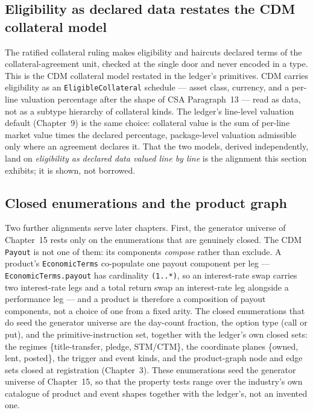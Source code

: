 \subsection{Eligibility as declared data restates the CDM collateral model}

The ratified collateral ruling makes eligibility and haircuts declared terms of
the collateral-agreement unit, checked at the single door and never encoded in a
type. This is the CDM collateral model restated in the ledger's primitives. CDM
carries eligibility as an \texttt{EligibleCollateral} schedule --- asset class,
currency, and a per-line valuation percentage after the shape of CSA
Paragraph~13 --- read as data, not as a subtype hierarchy of collateral kinds.
The ledger's line-level valuation default (Chapter~9) is the same choice:
collateral value is the sum of per-line market value times the declared
percentage, package-level valuation admissible only where an agreement declares
it. That the two models, derived independently, land on \emph{eligibility as
declared data valued line by line} is the alignment this section exhibits; it is
shown, not borrowed.

\subsection{Closed enumerations and the product graph}

Two further alignments serve later chapters. First, the generator universe of
Chapter~15 rests only on the enumerations that are genuinely closed. The CDM
\texttt{Payout} is not one of them: its components \emph{compose} rather than
exclude. A product's \texttt{EconomicTerms} co-populate one payout component per
leg --- \texttt{EconomicTerms.payout} has cardinality \texttt{(1..*)}, so an
interest-rate swap carries two interest-rate legs and a total return swap an
interest-rate leg alongside a performance leg --- and a product is therefore a
composition of payout components, not a choice of one from a fixed arity. The
closed enumerations that do seed the generator universe are the day-count
fraction, the option type (call or put), and the primitive-instruction set,
together with the ledger's own closed sets: the regimes \{title-transfer,
pledge, STM/CTM\}, the coordinate planes \{owned, lent, posted\}, the trigger and
event kinds, and the product-graph node and edge sets closed at registration
(Chapter~3). These enumerations seed the generator universe of Chapter~15, so
that the property tests range over the industry's own catalogue of product and
event shapes together with the ledger's, not an invented one.

